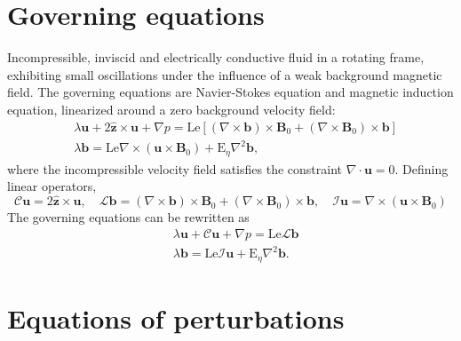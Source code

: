 \section{Governing equations}

Incompressible, inviscid and electrically conductive fluid in a rotating frame, exhibiting small oscillations under the influence of a weak background magnetic field. The governing equations are Navier-Stokes equation and magnetic induction equation, linearized around a zero background velocity field:
%
\begin{equation}
\begin{aligned}
    &\lambda \mathbf{u} + 2 \hat{\mathbf{z}} \times \mathbf{u} + \nabla p = \mathrm{Le} \left[(\nabla\times \mathbf{b}) \times \mathbf{B}_0 + (\nabla\times \mathbf{B}_0) \times \mathbf{b} \right] \\ 
    &\lambda \mathbf{b} = \mathrm{Le} \nabla\times (\mathbf{u}\times \mathbf{B}_0) + \mathrm{E}_\eta \nabla^2 \mathbf{b},
\end{aligned}
\end{equation}
%
where the incompressible velocity field satisfies the constraint $\nabla\cdot \mathbf{u} = 0$. Defining linear operators,
\begin{equation}
    \mathcal{C} \mathbf{u} = 2 \hat{\mathbf{z}} \times \mathbf{u}, \quad 
    \mathcal{L} \mathbf{b} = (\nabla\times \mathbf{b}) \times \mathbf{B}_0 + (\nabla\times \mathbf{B}_0) \times \mathbf{b}, \quad 
    \mathcal{I} \mathbf{u} = \nabla\times (\mathbf{u}\times \mathbf{B}_0)
\end{equation}
The governing equations can be rewritten as
%
\begin{equation}
    \begin{aligned}
        &\lambda \mathbf{u} + \mathcal{C} \mathbf{u} + \nabla p = \mathrm{Le} \mathcal{L}\mathbf{b} \\ 
        &\lambda \mathbf{b} = \mathrm{Le} \mathcal{I} \mathbf{u} + \mathrm{E}_\eta \nabla^2 \mathbf{b}.
    \end{aligned}
\end{equation}
%

\section{Equations of perturbations}

